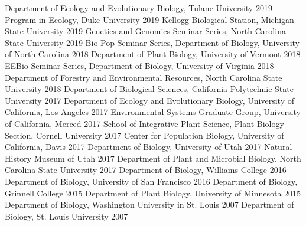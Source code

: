 \documentclass[11pt,english]{article}
\begin{document}
Department of Ecology and Evolutionary Biology, Tulane University \hfill {2019} \newline
Program in Ecology, Duke University \hfill {2019}\newline
Kellogg Biological Station, Michigan State University \hfill {2019} \newline
Genetics and Genomics Seminar Series, North Carolina State University \hfill {2019} \newline
Bio-Pop Seminar Series, Department of Biology, University of North Carolina \hfill {2018} \newline
Department of Plant Biology, University of Vermont \hfill {2018} \newline
EEBio Seminar Series, Department of Biology, University of Virginia \hfill {2018} \newline
Department of Forestry and Environmental Resources, North Carolina State University \hfill {2018} \newline
Department of Biological Sciences, California Polytechnic State University \hfill {2017} \newline
Department of Ecology and Evolutionary Biology, University of California, Los Angeles \hfill {2017} \newline
Environmental Systems Graduate Group, University of California, Merced \hfill {2017} \newline
School of Integrative Plant Science, Plant Biology Section, Cornell University \hfill {2017} \newline
Center for Population Biology, University of California, Davis \hfill {2017} \newline
Department of Biology, University of Utah \hfill {2017} \newline
Natural History Museum of Utah \hfill {2017} \newline
Department of Plant and Microbial Biology, North Carolina State University \hfill {2017} \newline
Department of Biology, Williams College \hfill {2016} \newline
Department of Biology, University of San Francisco \hfill {2016} \newline
Department of Biology, Grinnell College \hfill {2015} \newline
Department of Plant Biology, University of Minnesota \hfill {2015} \newline
Department of Biology, Washington University in St. Louis \hfill {2007} \newline
Department of Biology, St. Louis University \hfill {2007} \newline
\vspace{-2ex}
\end{document}
